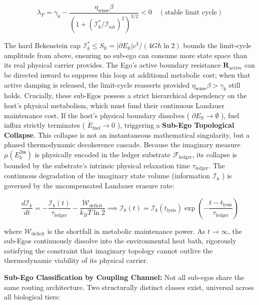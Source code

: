 \documentclass[11pt,a4paper]{article}
\theoremstyle{definition}
\theoremstyle{remark}
\begin{document}
\begin{equation}
\lambda_F = \gamma_k - \frac{\eta_{\text{sense}} \beta}{(1 + (\mathcal{I}_k^*/\mathcal{I}_{\text{sat}})^2)^{3/2}} < 0 \quad (\text{stable limit cycle})
\end{equation}


The hard Bekenstein cap $\mathcal{I}_k^* \leq S_{\mathbb{R}} = |\partial E_{\mathbb{R}}| c^3 / (4G\hbar \ln 2)$ bounds the limit-cycle amplitude from above, ensuring no sub-ego can consume more state space than its real physical carrier provides. The Ego's active boundary resistance $\mathbf{R}_{\text{active}}$ can be directed inward to suppress this loop at additional metabolic cost; when that active damping is released, the limit-cycle reasserts provided $\eta_{\text{sense}} \beta > \gamma_k$ still holds.
Crucially, these sub-Egos possess a strict hierarchical dependency on the host's physical metabolism, which must fund their continuous Landauer maintenance cost. If the host's physical boundary dissolves ( $\partial E_{\mathbb{R}} \to \emptyset$ ), fuel influx strictly terminates ( $\dot{E}_{\text{fuel}} \to 0$ ), triggering a \textbf{Sub-Ego Topological Collapse}. This collapse is not an instantaneous mathematical singularity, but a phased thermodynamic decoherence cascade. Because the imaginary measure $\mu(E_k^{\mathfrak{Im}})$ is physically encoded in the ledger substrate $\mathcal{F}_{\text{ledger}}$, its collapse is bounded by the substrate's intrinsic physical relaxation time $\tau_{\text{ledger}}$. The continuous degradation of the imaginary state volume (information $\mathcal{I}_k$ ) is governed by the uncompensated Landauer erasure rate:


\begin{equation}
\boxed{ \frac{d\mathcal{I}_k}{dt} = - \frac{\mathcal{I}_k(t)}{\tau_{\text{ledger}}} - \frac{\dot{\mathcal{W}}_{\text{deficit}}}{k_B T \ln 2} \implies \mathcal{I}_k(t) = \mathcal{I}_k(t_{\text{lysis}}) \exp\left( - \frac{t - t_{\text{lysis}}}{\tau_{\text{ledger}}} \right) }
\end{equation}


where $\dot{\mathcal{W}}_{\text{deficit}}$ is the shortfall in metabolic maintenance power. As $t \to \infty$, the sub-Egos continuously dissolve into the environmental heat bath, rigorously satisfying the constraint that imaginary topology cannot outlive the thermodynamic viability of its physical carrier.

\textbf{Sub-Ego Classification by Coupling Channel:} Not all sub-egos share the same routing architecture. Two structurally distinct classes exist, universal across all biological tiers:
\end{document}
